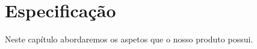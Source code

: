\chapter{Especificação}

Neste capítulo abordaremos os aspetos que o nosso produto possui.



\newpage

\newpage


\newpage


\newpage


\newpage


\newpage